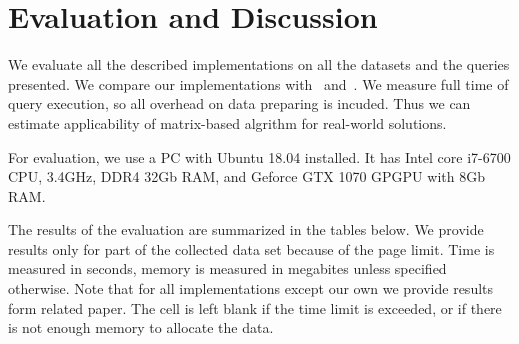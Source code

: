 \section{Evaluation and Discussion}

We evaluate all the described implementations on all the datasets and the queries presented.
We compare our implementations with~\cite{Mishin:2019:ECP:3327964.3328503} and~\cite{Kuijpers:2019:ESC:3335783.3335791}.
We measure full time of query execution, so all overhead on data preparing is incuded.
Thus we can estimate applicability of matrix-based algrithm for real-world solutions.

For evaluation, we use a PC with Ubuntu 18.04 installed.
It has Intel core i7-6700 CPU, 3.4GHz, DDR4 32Gb RAM, and Geforce GTX 1070 GPGPU with 8Gb RAM.

The results of the evaluation are summarized in the tables below.
We provide results only for part of the collected data set because of the page limit.
Time is measured in seconds, memory is measured in megabites unless specified otherwise.
Note that for all implementations except our own we provide results form related paper.
The cell is left blank if the time limit is exceeded, or if there is not enough memory to allocate the data.

